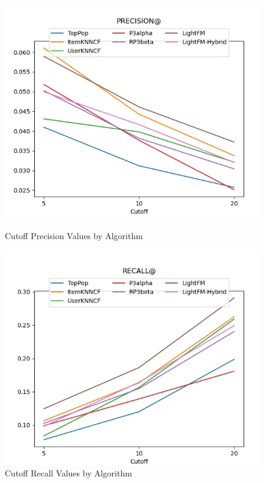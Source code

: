 \begin{figure}[h!]
    \centering
    \begin{minipage}{0.49\textwidth}
        \centering
        \includegraphics[width=\linewidth]{images/precision_plot.png}
        \caption{Cutoff Precision Values by Algorithm}
        \label{fig:precision}
    \end{minipage}\hfill
    \begin{minipage}{0.49\textwidth}
        \centering
        \includegraphics[width=\linewidth]{images/recall_plot.png}
        \caption{Cutoff Recall Values by Algorithm}
        \label{fig:recall}
    \end{minipage}
\end{figure}


